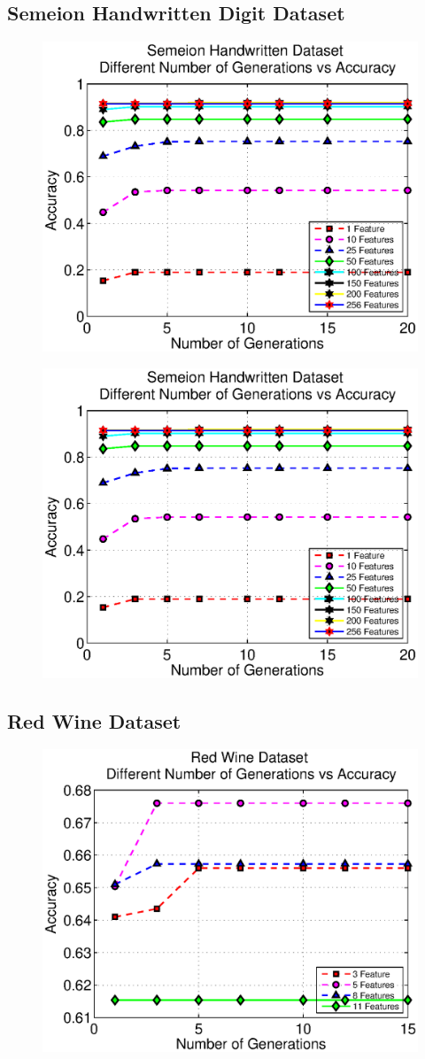 \documentclass[11pt,onecolumn,a4paper]{report}
\begin{document}
\subsection{Semeion Handwritten Digit Dataset }

    \begin{figure}[t]
      \includegraphics[width=0.45\linewidth]{img/seimfeat.eps}
      \label{fig:digraph}
    \end{figure}
     
    \begin{figure}[t]
      \includegraphics[width=0.45\linewidth]{img/seimfeat.eps}
      \label{fig:digraph}
    \end{figure}

\subsection{Red Wine Dataset }

   \begin{figure}[ht]
      \includegraphics[width=0.45\linewidth]{img/winefeat.eps}
      \label{fig:digraph}
   \end{figure}
\end{document}
